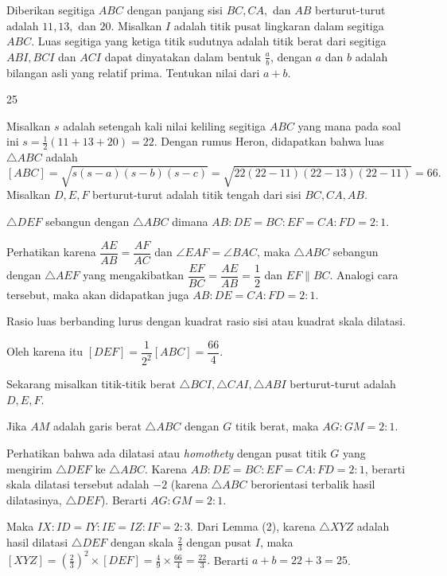 \documentclass[11pt]{scrartcl}
\begin{document}
	\begin{soaljawab}
		Diberikan segitiga $ABC$ dengan panjang sisi $BC,CA,$ dan $AB$ berturut-turut adalah $11,13,$ dan $20$. Misalkan $I$ adalah titik pusat lingkaran dalam segitiga $ABC$. Luas segitiga yang ketiga titik sudutnya adalah titik berat dari segitiga $ABI,BCI$ dan $ACI$ dapat dinyatakan dalam bentuk $\frac{a}{b}$, dengan $a$ dan $b$ adalah bilangan asli yang relatif prima. Tentukan nilai dari $a+b$.
		
		\begin{jawaban}
		25
		\end{jawaban}
		\begin{solusi}
		Misalkan $s$ adalah setengah kali nilai keliling segitiga $ABC$ yang mana pada soal ini $s = \frac12(11+13+20) = 22$. Dengan rumus Heron, didapatkan bahwa luas $\triangle ABC$ adalah $$[ABC]=\sqrt{s(s-a)(s-b)(s-c)}=\sqrt{22(22-11)(22-13)(22-11)}=66.$$
		Misalkan $D,E,F$ berturut-turut adalah titik tengah dari sisi $BC,CA,AB$. 
		\begin{lemmarev}[1]
				$\triangle DEF$ sebangun dengan $\triangle ABC$ dimana $AB:DE=BC:EF=CA:FD=2:1$.
				
				\begin{buktilemma}
					Perhatikan karena $\dfrac{AE}{AB}=\dfrac{AF}{AC}$ dan $\angle EAF = \angle BAC$, maka $\triangle ABC$ sebangun dengan $\triangle AEF$ yang mengakibatkan $\dfrac{EF}{BC}=\dfrac{AE}{AB}=\dfrac{1}{2}$ dan $EF \parallel BC$. Analogi cara tersebut, maka akan didapatkan juga $AB:DE=CA:FD=2:1$.
				\end{buktilemma}
			\end{lemmarev}
		
		
		\begin{lemmarev}[2]
				Rasio luas berbanding lurus dengan kuadrat rasio sisi atau kuadrat skala dilatasi.
		\end{lemmarev}
		Oleh karena itu  $[DEF]=\dfrac{1}{2^2}[ABC]=\dfrac{66}{4}$.
		
		Sekarang misalkan titik-titik berat $\triangle BCI, \triangle CAI, \triangle ABI$ berturut-turut adalah $D,E,F$. 
		
		\begin{lemmarev}[3]
			Jika $AM$ adalah garis berat $\triangle ABC$ dengan $G$ titik berat, maka $AG:GM = 2:1$.
			\begin{buktilemma}
			Perhatikan bahwa ada dilatasi atau \textit{ homothety } dengan pusat titik $G$ yang mengirim $\triangle DEF$ ke $\triangle ABC$. Karena $AB:DE=BC:EF=CA:FD=2:1$, berarti skala dilatasi tersebut adalah $-2$ (karena $\triangle ABC$ berorientasi terbalik hasil dilatasinya, $\triangle DEF$). Berarti $AG:GM=2:1$.
			\end{buktilemma}
		\end{lemmarev}
		
		Maka $IX:ID=IY:IE=IZ:IF=2:3$. Dari Lemma (2), karena $\triangle XYZ$ adalah hasil dilatasi $\triangle DEF$ dengan skala $\frac{2}{3}$ dengan pusat $I$, maka $[XYZ]=\left (\frac{2}{3}\right)^2\times [DEF]=\frac{4}{9}\times\frac{66}{4}=\frac{22}{3}.$ Berarti $a+b=22+3=25$.
		
		\end{solusi}
	\end{soaljawab}
	
\end{document}
